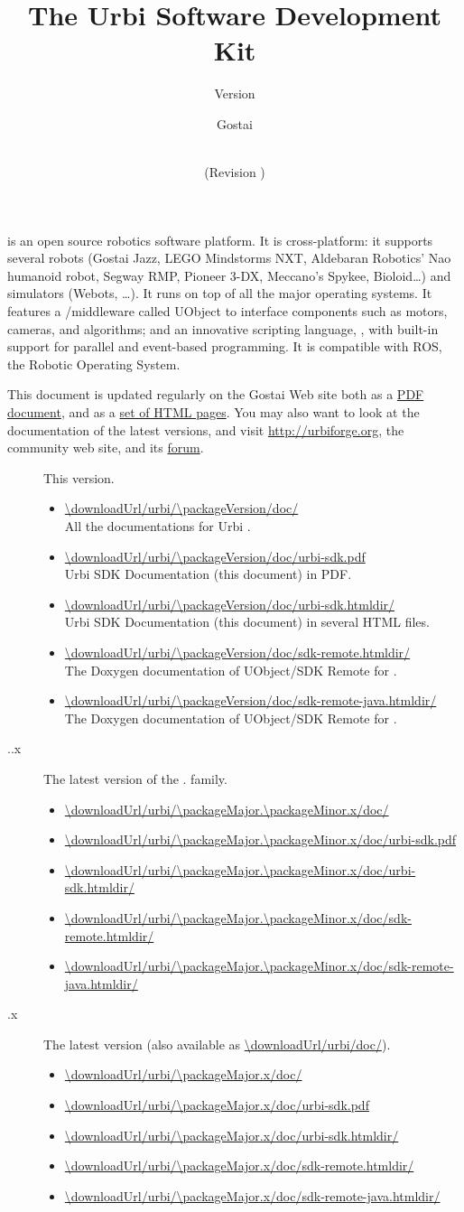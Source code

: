 \documentclass[openright,twoside,11pt,final]{book}
\title{The Urbi Software Development Kit}
\subtitle{Version \packageVersion}
\date{\VcsDay\\(Revision \VcsDescription)}
\author{Gostai}
\begin{document}
\maketitle

\urbi is an open source robotics software platform.  It is cross-platform:
it supports several robots (Gostai Jazz, LEGO Mindstorms NXT, Aldebaran
Robotics' Nao humanoid robot, Segway RMP, Pioneer 3-DX, Meccano's Spykee,
Bioloid\ldots) and simulators (Webots, \ldots).  It runs on top of all the
major operating systems.  It features a \Cxx/\Java middleware called UObject
to interface components such as motors, cameras, and algorithms; and an
innovative scripting language, \us, with built-in support for parallel and
event-based programming.  It is compatible with ROS, the Robotic Operating
System.

\bigskip

This document is updated regularly on the Gostai Web site both as a
\href{\docurl/urbi-sdk.pdf}{PDF document}, and as a
\href{\docurl/urbi-sdk.htmldir/}{set of HTML pages}.  You may also want to
look at the documentation of the latest versions, and visit
\url{http://urbiforge.org}, the \urbi community web site, and its
\href{http://forum.urbiforge.org}{forum}.

\newcommand{\docItem}[2]{\item \url{#1} \\ #2.}
\newcommand{\versionItem}[2]
{
\item[\packageName{} #1] #2.

  \begin{itemize}
  \docItem{\downloadUrl/urbi/#1/doc/}
  {All the documentations for Urbi #1}
  \docItem{\downloadUrl/urbi/#1/doc/urbi-sdk.pdf}
  {Urbi SDK Documentation (this document) in PDF}
  \docItem{\downloadUrl/urbi/#1/doc/urbi-sdk.htmldir/}
  {Urbi SDK Documentation (this document) in several HTML files}
  \docItem{\downloadUrl/urbi/#1/doc/sdk-remote.htmldir/}
  {The Doxygen documentation of UObject/SDK Remote for \Cxx}
  \docItem{\downloadUrl/urbi/#1/doc/sdk-remote-java.htmldir/}%
  {The Doxygen documentation of UObject/SDK Remote for \Java}
  \end{itemize}
}

\begin{description}
\versionItem{\packageVersion}{This version}
\renewcommand{\docItem}[2]{\item \url{#1}}
\versionItem{\packageMajor.\packageMinor.x}{The latest version of the
  \packageMajor.\packageMinor{} family}
\versionItem{\packageMajor.x}{The latest version (also available as
  \url{\downloadUrl/urbi/doc/})}
\end{description}



\tableofcontents







{
  
}

\end{document}
